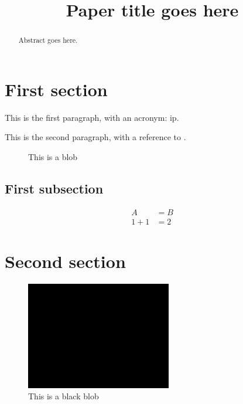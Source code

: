 \documentclass[conference]{IEEEtran}
\begin{document}
\title{Paper title goes here}

\author{
}
\maketitle


\begin{abstract}
Abstract goes here.
\end{abstract}

\section{First section}
\label{sec:first_section}

This is the first paragraph, with an acronym: \ac{ip}.

This is the second paragraph, with a reference to \cite{ref}.
\begin{figure}[htb]
  \centering
  \caption{
    This is a blob
  }
  \label{fig:blob}
\end{figure}

\subsection{First subsection}
\label{sec:first_subsection}

\begin{align}
  \label{eq:1}
  A & = B \\
  \label{eq:2}
  1 + 1 & = 2
\end{align}

\section{Second section}
\label{sec:second_section}

\begin{figure}[htb]
  \centering
  \includegraphics[width=2.5in]{figures/blob}
  \caption{
    This is a black blob
  }
  \label{fig:picture}
\end{figure}



\end{document}

